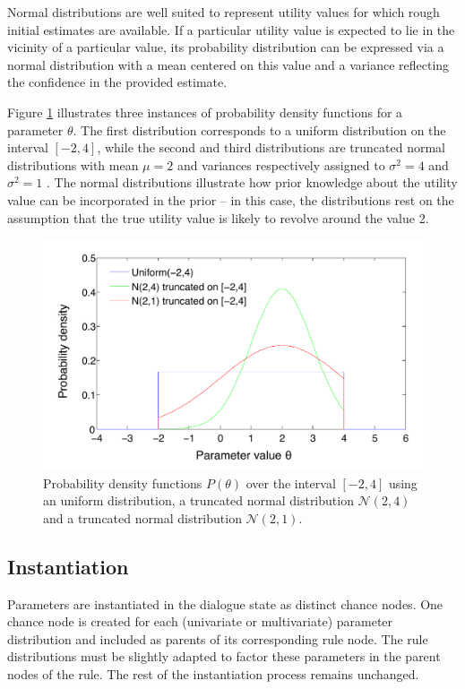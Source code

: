 Normal distributions are well suited to represent utility values for which rough initial estimates are available. If a particular utility value is expected to lie in the vicinity of a particular value, its probability distribution can be expressed via a normal distribution with a mean centered on this value and a variance reflecting the confidence in the provided estimate. 

Figure \ref{fig:uniformn} illustrates three instances of probability density functions for a parameter $\theta$.  The first distribution corresponds to a uniform distribution on the interval $[-2,4]$, while the second and third distributions are truncated normal distributions with mean $\mu=2$ and variances respectively assigned to $\sigma^2=4$ and $\sigma^2=1$ . The normal distributions illustrate how prior knowledge about the utility value can be incorporated in the prior -- in this case, the distributions rest on the assumption that the true utility value is likely to revolve around the value 2. 

\begin{figure}[h]
\centering
\includegraphics[scale=0.45]{imgs/uniformn.pdf}
\caption{Probability density functions $P(\theta)$ over the interval $[-2,4]$ using an uniform distribution, a truncated normal distribution $\mathcal{N}(2,4)$ and a truncated normal distribution $\mathcal{N}(2,1)$.} 
\label{fig:uniformn}
\end{figure}

\subsection{Instantiation}
\label{sec:rule-params-instantiation}

Parameters are instantiated in the dialogue state as distinct chance nodes.  One chance node is created  for each (univariate or multivariate) parameter distribution and included as parents of its corresponding rule node.   The rule distributions must be slightly adapted to factor these parameters in the parent nodes of the rule.  The rest of the instantiation process remains unchanged. 

